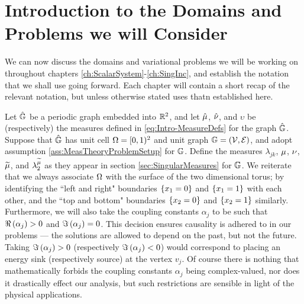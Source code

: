 \section{Introduction to the Domains and Problems we will Consider} \label{sec:TP-DomainSetup}
We can now discuss the domains and variational problems we will be working on throughout chapters \ref{ch:ScalarSystem}-\ref{ch:SingInc}, and establish the notation that we shall use going forward.
Each chapter will contain a short recap of the relevant notation, but unless otherwise stated uses thatn established here.

Let $\hat{\mathbb{G}}$ be a periodic graph embedded into $\mathbb{R}^2$, and let $\hat{\mu}$, $\hat{\nu}$, and $\upsilon$ be (respectively) the measures defined in \eqref{eq:Intro-MeasureDefs} for the graph $\hat{\mathbb{G}}$.
Suppose that $\hat{\mathbb{G}}$ has unit cell $\Omega=[0,1)^2$ and unit graph $\mathbb{G}=\left( \mathcal{V}, \mathcal{E} \right)$, and adopt assumption \ref{ass:MeasTheoryProblemSetup} for $\mathbb{G}$.
Define the measures $\lambda_{jk}$, $\mu$, $\nu$, $\widetilde{\mu}$, and $\lambda_2^{\widetilde{\mu}}$ as they appear in section \ref{sec:SingularMeasures} for $\mathbb{G}$.
We reiterate that we always associate $\Omega$ with the surface of the two dimensional torus; by identifying the ``left and right" boundaries $\left\{ x_1=0 \right\}$ and $\left\{ x_1=1 \right\}$ with each other, and the ``top and bottom" boundaries $\left\{ x_2=0 \right\}$ and $\left\{ x_2=1 \right\}$ similarly.
Furthermore, we will also take the coupling constants $\alpha_j$ to be such that $\Re\left( \alpha_j \right)>0$ and $\Im\left( \alpha_j \right) = 0$.
This decision ensures causality is adhered to in our problems --- the solutions are allowed to depend on the past, but not the future.
Taking $\Im\left( \alpha_j \right) > 0$ (respectively $\Im\left( \alpha_j \right) < 0$) would correspond to placing an energy sink (respectively source) at the vertex $v_j$.
Of course there is nothing that mathematically forbids the coupling constants $\alpha_j$ being complex-valued, nor does it drastically effect our analysis, but such restrictions are sensible in light of the physical applications. 

